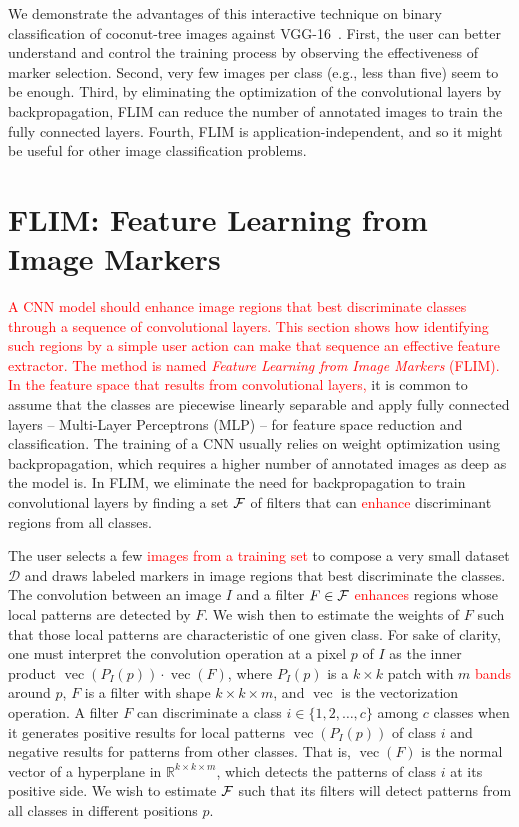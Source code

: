\documentclass[journal, twoside]{IEEEtran}
\DeclareMathOperator{\vect}{vec}
\newcommand{\R}{\mathbb{R}}
\newcommand{\D}{\mathcal{D}}
\begin{document}
We demonstrate the advantages of this interactive technique on binary classification of coconut-tree images against  VGG-16~\cite{simonyan2014very}. First, the user can better understand and control the training process by observing the effectiveness of marker selection.  Second, very few images per class (e.g., less than five) seem to be enough. Third, by eliminating the optimization of the convolutional layers by backpropagation, FLIM can reduce the number of annotated images to train the fully connected layers. Fourth, FLIM is application-independent, and so it might be useful for other image classification problems.

\section{FLIM: Feature Learning from Image Markers}
\label{sec:method}
  
\textcolor{red}{A CNN model should enhance image regions that best discriminate classes through a sequence of convolutional layers. This section shows how identifying such regions by a simple user action can make that sequence an effective feature extractor. The method is named \emph{Feature Learning from Image Markers} (FLIM). In the feature space that results from convolutional layers,} it is common to assume that the classes are piecewise linearly separable and apply fully connected layers -- Multi-Layer Perceptrons (MLP) -- for feature space reduction and classification. The training of a CNN usually relies on weight optimization using backpropagation, which requires a higher number of annotated images as deep as the model is. In FLIM, we eliminate the need for backpropagation to train convolutional layers by finding a set ${\cal F}$ of filters that can \textcolor{red}{enhance} discriminant regions from all classes.

The user selects a few \textcolor{red}{images from a training set} to compose a very small dataset $\D$ and draws labeled markers in image regions that best discriminate the classes. The convolution between an image $I$ and a filter $F\in {\cal F}$ \textcolor{red}{ enhances} regions whose local patterns are detected by $F$. We wish then to estimate the weights of $F$ such that those local patterns are characteristic of one given class. For sake of clarity, one must interpret the convolution operation at a pixel $p$ of $I$ as the inner product $\vect(P_I(p)) \cdot \vect(F)$, where $P_I(p)$ is a $k\times k$ patch with $m$ \textcolor{red}{bands} around $p$, $F$ is a filter with shape $k\times k \times m$, and $\vect$ is the vectorization operation. A filter $F$ can discriminate a class $i \in \{1,2,\ldots,c\}$ among $c$ classes when it generates positive results for local patterns $\vect(P_I(p))$ of class $i$ and negative results for patterns from other classes. That is, $\vect(F)$ is the normal vector of a hyperplane in $\R^{k\times k\times m}$, which detects the patterns of class $i$ at its positive side. We wish to estimate ${\cal F}$ such that its filters will detect patterns from all classes in different positions $p$. 
\end{document}

